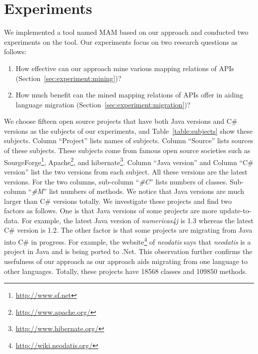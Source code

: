 \section{Experiments}
\label{sec:experiment} We implemented a tool named MAM based on our
approach and conducted two experiments on the tool. Our experiments
focus on two research questions as follows:
\vspace*{-1.5ex}\begin{enumerate}
\item How effective can our approach mine various mapping relations of APIs
(Section~\ref{sec:experiment:mining})? \vspace*{-1.5ex}
\item How much benefit can the mined mapping relations of APIs offer in aiding language
migration (Section~\ref{sec:experiment:migration})?\vspace*{-1.5ex}
\end{enumerate}%

We choose fifteen open source projects that have both Java versions
and C\# versions as the subjects of our experiments, and
Table~\ref{table:subjects} show these subjects. Column ``Project''
lists names of subjects. Column ``Source'' lists sources of these
subjects. These subjects come from famous open source societies such
as SourgeForge\footnote{\url{http://www.sf.net}},
Apache\footnote{\url{http://www.apache.org/}}, and
hibernate\footnote{\url{http://www.hibernate.org/}}. Column ``Java
version'' and Column ``C\# version'' list the two versions from each
subject. All these versions are the latest versions. For the two
columns, sub-column ``\emph{\#C}'' lists numbers of classes.
Sub-column ``\emph{\#M}'' list numbers of methods. We notice that
Java versions are much larger than C\# versions totally. We
investigate these projects and find two factors as follows. One is
that Java versions of some projects are more update-to-data. For
example, the latest Java version of \emph{numericas4j} is 1.3
whereas the latest C\# version is 1.2. The other factor is that some
projects are migrating from Java into C\# in progress. For example,
the website\footnote{\url{http://wiki.neodatis.org/}} of
\emph{neodatis} says that \emph{neodatis} is a project in Java and
is being ported to .Net. This observation further confirms the
usefulness of our approach as our approach aids migrating from one
language to other languages. Totally, these projects have 18568
classes and 109850 methods.

